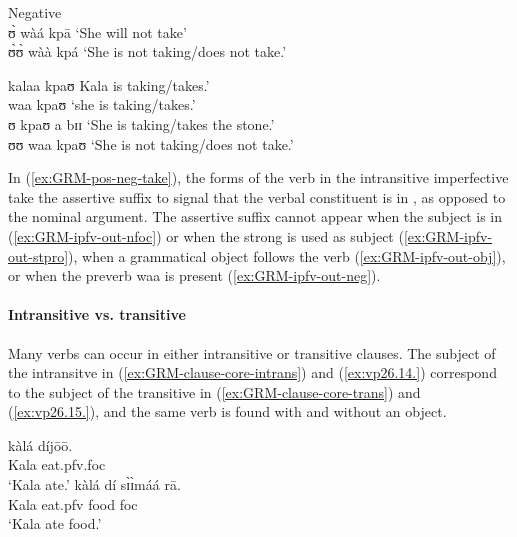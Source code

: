 \begin{exe}
\begin{exe}
\begin{exe}
\begin{exe}
\begin{exe}
\begin{exe}
\begin{exe}
\begin{exe}
\begin{exe}
\begin{exe}
\begin{exe}
\ex\label{ex:GRM-ipfv-out-neg}{\rm Negative}\\
 ʊ̀ wàá kpā  {\rm  `She will not take'}\\
   ʊ̀ʊ̀   wàà   kpá {\rm `She  is not taking/does not take.'}

   
   \ex\label{ex:GRM-ipfv-out-nfoc}
 \textasteriskcentered kalaa kpaʊ {\rm Kala is taking/takes.'}\\
   \ex\label{ex:GRM-ipfv-out-stpro}
 \textasteriskcentered waa kpaʊ {\rm `{\sc she} is taking/takes.'}\\
    \ex\label{ex:GRM-ipfv-out-obj}
  \textasteriskcentered ʊ kpaʊ a bɪɪ  {\rm `She  is taking/takes the 
stone.'}\\
 \ex\label{ex:GRM-ipfv-out-neg1}
   \textasteriskcentered   ʊʊ   waa   kpaʊ {\rm `She  is not taking/does 
not take.'}

\z 
 \z

In (\ref{ex:GRM-pos-neg-take}), the forms of the verb in the
intransitive imperfective take the assertive suffix to signal that the verbal
constituent is in , as opposed to the nominal argument. The 
assertive suffix cannot appear
when the subject is in  (\ref{ex:GRM-ipfv-out-nfoc}) or when the strong
 is used as subject (\ref{ex:GRM-ipfv-out-stpro}), when a grammatical
object follows the verb  (\ref{ex:GRM-ipfv-out-obj}), or when the 
preverb {\sls waa} is present  (\ref{ex:GRM-ipfv-out-neg}).



\paragraph{Intransitive vs. transitive}
\label{sec:GRM-trans-intran}


Many verbs can occur in either  intransitive or transitive clauses. The subject 
of the intransitve  in (\ref{ex:GRM-clause-core-intrans}) and 
(\ref{ex:vp26.14.}) correspond to the subject of the transitive  in  
(\ref{ex:GRM-clause-core-trans}) and (\ref{ex:vp26.15.}), and the same verb is 
found with and without an object.


\ea\label{ex:GRM-clause-core}


 \ea\label{ex:GRM-clause-core-intrans}
\gll kàlá díjōō.\\
 Kala eat.{\sc pfv.foc}\\
\glt  `Kala {\sc ate}.' 
\ex\label{ex:GRM-clause-core-trans}
\gll kàlá dí sɪ̀ɪ̀máá rā.\\
Kala eat.{\sc pfv}  food {\sc foc}\\
\glt  `Kala ate {\sc food}.' 




\end{exe}
\end{exe}
\end{exe}
\end{exe}
\end{exe}
\end{exe}
\end{exe}
\end{exe}
\end{exe}
\end{exe}
\end{exe}
